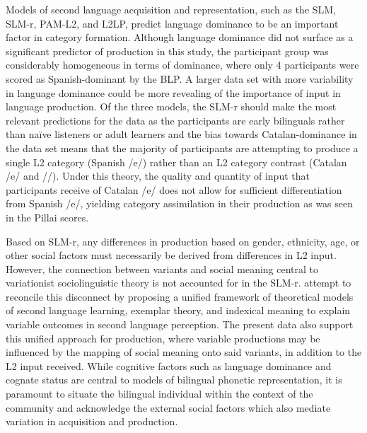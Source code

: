 \documentclass[output=paper,colorlinks,citecolor=brown,draftmode]{langscibook}
\begin{document}
Models of second language acquisition and representation, such as the SLM, SLM-r, PAM-L2, and L2LP, predict language dominance to be an important factor in category formation. Although language dominance did not surface as a significant predictor of production in this study, the participant group was considerably homogeneous in terms of dominance, where only 4 participants were scored as Spanish-dominant by the BLP. A larger data set with more variability in language dominance could be more revealing of the importance of input in language production. Of the three models, the SLM-r should make the most relevant predictions for the data as the participants are early bilinguals rather than na{\"i}ve listeners or adult learners and the bias towards Catalan-dominance in the data set means that the majority of participants are attempting to produce a single L2 category (Spanish /e/) rather than an L2 category contrast (Catalan /e/ and /\textepsilon/). Under this theory, the quality and quantity of input that participants receive of Catalan /e/ does not allow for sufficient differentiation from Spanish /e/, yielding category assimilation in their production as was seen in the Pillai scores.

Based on SLM-r, any differences in production based on gender, ethnicity, age, or other social factors must necessarily be derived from differences in L2 input. However, the connection between variants and social meaning central to variationist sociolinguistic theory is not accounted for in the SLM-r. \citet{chappell2021learners} attempt to reconcile this disconnect by proposing a unified framework of theoretical models of second language learning, exemplar theory, and indexical meaning to explain variable outcomes in second language perception. The present data also support this unified approach for production, where variable productions may be influenced by the mapping of social meaning onto said variants, in addition to the L2 input received. While cognitive factors such as language dominance and cognate status are central to models of bilingual phonetic representation, it is paramount to situate the bilingual individual within the context of the community and acknowledge the external social factors which also mediate variation in acquisition and production.
\end{document}
